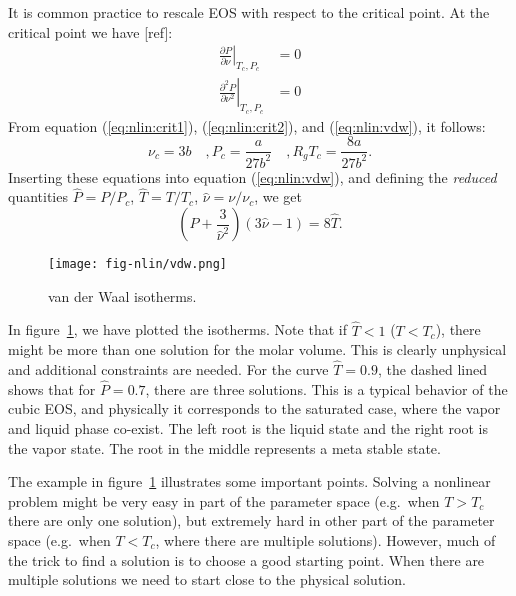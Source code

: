 \documentclass[graybox,sectrefs,envcountresetchap,open=right,final]{svmonodo}
\newenvironment{graybox2admon}[1][]{
\begin{graybox2mdframed}[frametitle=#1]
}
{
\end{graybox2mdframed}
}
\begin{document}
It is common practice to rescale EOS with respect to the critical point. At the critical point we have [ref]:
\begin{align}
\left.\frac{\partial P}{\partial \nu}\right|_{T_c,P_c} &=0
\label{eq:nlin:crit1} \\ 
\left.\frac{\partial^2 P}{\partial \nu^2}\right|_{T_c,P_c} &=0
\label{eq:nlin:crit2} 
\end{align}
From equation (\ref{eq:nlin:crit1}),  (\ref{eq:nlin:crit2}), and (\ref{eq:nlin:vdw}), it follows:
\begin{equation}
\nu_c=3b\quad,P_c=\frac{a}{27b^2}\quad,R_gT_c=\frac{8a}{27b^2}.
\label{eq:nlin:crit3}
\end{equation}
Inserting these equations into equation (\ref{eq:nlin:vdw}), and defining the \emph{reduced} quantities $\hat{P}=P/P_c$, $\hat{T}=T/T_c$, $\hat{\nu}=\nu/\nu_c$, we get
\begin{equation}
\left(\hat{P}+\frac{3}{\hat{\nu}^2}\right)\left(3\hat{\nu}-1\right)=8\hat{T}.
\label{eq:nlin:vdwr}
\end{equation}

\begin{figure}[!ht]  %
  \centerline{\texttt{[image: fig-nlin/vdw.png]}}
  \caption{
  van der Waal isotherms. \label{fig:nlin:vdw}
  }
\end{figure}

In figure~\ref{fig:nlin:vdw}, we have plotted the isotherms. Note that if $\hat{T}<1$ ($T<T_c$), there might be more than one solution for the molar volume. This is clearly unphysical and additional constraints are needed. For the curve $\hat{T}=0.9$, the dashed lined shows that for $\hat{P}=0.7$, there are three solutions. This is a typical behavior of the cubic EOS, and physically it corresponds to the saturated case, where the vapor and liquid phase co-exist. The left root is the liquid state and the right root is the vapor state. The root in the middle represents a meta stable state.



\begin{graybox2admon}[It never hurts to look at your function]
The example in figure~\ref{fig:nlin:vdw} illustrates some important points. Solving a nonlinear problem might be very easy in part of the parameter space (e.g.~when $T>T_c$ there are only one solution), but extremely hard in other part of the parameter space (e.g.~when $T<T_c$, where there are multiple solutions). However, much of the trick to find a solution is to choose a good starting point. When there are multiple solutions we need to start close to the physical solution.
\end{graybox2admon}
\end{document}
